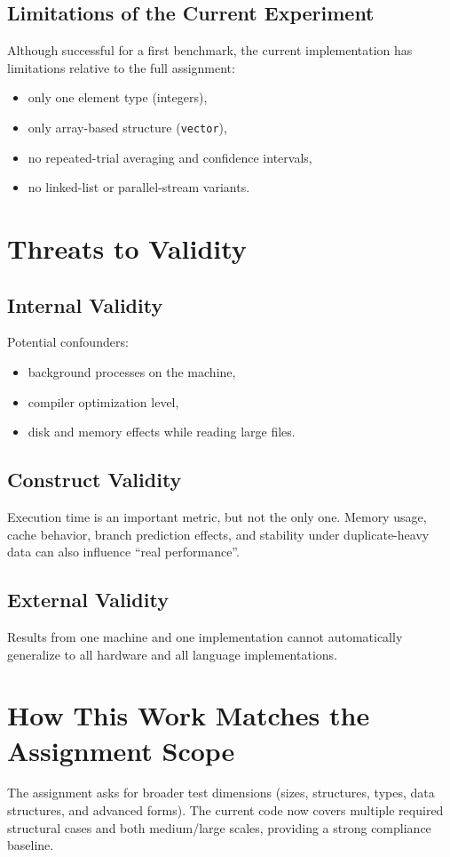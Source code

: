 \documentclass[12pt,a4paper]{article}
\begin{document}
\subsection{Limitations of the Current Experiment}
Although successful for a first benchmark, the current implementation has limitations relative to the full assignment:
\begin{itemize}
    \item only one element type (integers),
    \item only array-based structure (\texttt{vector}),
    \item no repeated-trial averaging and confidence intervals,
    \item no linked-list or parallel-stream variants.
\end{itemize}

\section{Threats to Validity}
\subsection{Internal Validity}
Potential confounders:
\begin{itemize}
    \item background processes on the machine,
    \item compiler optimization level,
    \item disk and memory effects while reading large files.
\end{itemize}

\subsection{Construct Validity}
Execution time is an important metric, but not the only one. Memory usage, cache behavior, branch prediction effects, and stability under duplicate-heavy data can also influence ``real performance''.

\subsection{External Validity}
Results from one machine and one implementation cannot automatically generalize to all hardware and all language implementations.

\section{How This Work Matches the Assignment Scope}
The assignment asks for broader test dimensions (sizes, structures, types, data structures, and advanced forms). The current code now covers multiple required structural cases and both medium/large scales, providing a strong compliance baseline.
\end{document}
